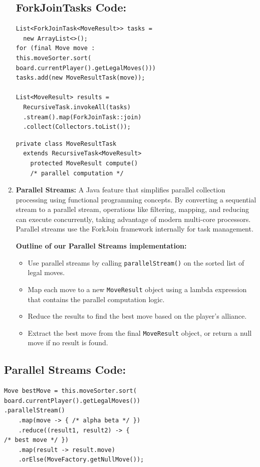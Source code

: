 \documentclass[conference, 11pt]{IEEEtran}
\begin{document}
\begin{enumerate}
\subsection{ForkJoinTasks Code:}
\lstset{basicstyle=\small}
\begin{lstlisting}
List<ForkJoinTask<MoveResult>> tasks =
  new ArrayList<>();
for (final Move move :
this.moveSorter.sort(
board.currentPlayer().getLegalMoves()))
tasks.add(new MoveResultTask(move));

List<MoveResult> results =
  RecursiveTask.invokeAll(tasks)
  .stream().map(ForkJoinTask::join)
  .collect(Collectors.toList());
\end{lstlisting}

\lstset{basicstyle=\small}
\begin{lstlisting}
private class MoveResultTask
  extends RecursiveTask<MoveResult> 
    protected MoveResult compute()
	/* parallel computation */
\end{lstlisting}



\item \textbf{Parallel Streams:} A Java feature that simplifies parallel collection processing using functional programming concepts. By converting a sequential stream to a parallel stream, operations like filtering, mapping, and reducing can execute concurrently, taking advantage of modern multi-core processors. Parallel streams use the ForkJoin framework internally for task management.

\textbf{Outline of our Parallel Streams implementation:}
\begin{itemize}
\item Use parallel streams by calling \texttt{parallelStream()} on the sorted list of legal moves.
\item Map each move to a new \texttt{MoveResult} object using a lambda expression that contains the parallel computation logic.
\item Reduce the results to find the best move based on the player's alliance.
\item Extract the best move from the final \texttt{MoveResult} object, or return a null move if no result is found.
\end{itemize}
\end{enumerate}

\subsection{Parallel Streams Code:}
\lstset{basicstyle=\small}
\begin{lstlisting}
Move bestMove = this.moveSorter.sort(
board.currentPlayer().getLegalMoves())
.parallelStream()
    .map(move -> { /* alpha beta */ })
    .reduce((result1, result2) -> {
/* best move */ })
    .map(result -> result.move)
    .orElse(MoveFactory.getNullMove());
\end{lstlisting}
\end{document}
